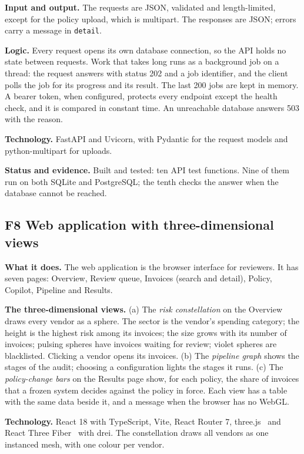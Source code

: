 \documentclass[11pt,a4paper]{article}
\begin{document}
\textbf{Input and output.} The requests are JSON, validated and length-limited, except for the policy upload, which is multipart. The responses are JSON; errors carry a message in \texttt{detail}.

\textbf{Logic.} Every request opens its own database connection, so the API holds no state between requests. Work that takes long runs as a background job on a thread: the request answers with status 202 and a job identifier, and the client polls the job for its progress and its result. The last 200 jobs are kept in memory. A bearer token, when configured, protects every endpoint except the health check, and it is compared in constant time. An unreachable database answers 503 with the reason.

\textbf{Technology.} FastAPI and Uvicorn, with Pydantic for the request models and python-multipart for uploads.

\textbf{Status and evidence.} Built and tested: ten API test functions. Nine of them run on both SQLite and PostgreSQL; the tenth checks the answer when the database cannot be reached.

\subsection{F8 Web application with three-dimensional views}
\textbf{What it does.} The web application is the browser interface for reviewers. It has seven pages: Overview, Review queue, Invoices (search and detail), Policy, Copilot, Pipeline and Results.

\textbf{The three-dimensional views.} (a) The \emph{risk constellation} on the Overview draws every vendor as a sphere. The sector is the vendor's spending category; the height is the highest risk among its invoices; the size grows with its number of invoices; pulsing spheres have invoices waiting for review; violet spheres are blacklisted. Clicking a vendor opens its invoices. (b) The \emph{pipeline graph} shows the stages of the audit; choosing a configuration lights the stages it runs. (c) The \emph{policy-change bars} on the Results page show, for each policy, the share of invoices that a frozen system decides against the policy in force. Each view has a table with the same data beside it, and a message when the browser has no WebGL.

\textbf{Technology.} React 18 with TypeScript, Vite, React Router 7, three.js~\cite{threejs} and React Three Fiber~\cite{r3f} with drei. The constellation draws all vendors as one instanced mesh, with one colour per vendor.
\end{document}
